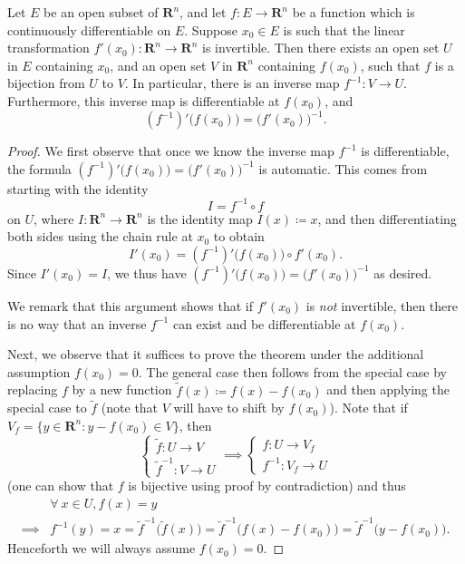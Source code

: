 \begin{theorem}\label{6.7.2}
    Let \(E\) be an open subset of \(\mathbf{R}^n\), and let \(f : E \to \mathbf{R}^n\) be a function which is continuously differentiable on \(E\).
    Suppose \(x_0 \in E\) is such that the linear transformation \(f'(x_0) : \mathbf{R}^n \to \mathbf{R}^n\) is invertible.
    Then there exists an open set \(U\) in \(E\) containing \(x_0\), and an open set \(V\) in \(\mathbf{R}^n\) containing \(f(x_0)\), such that \(f\) is a bijection from \(U\) to \(V\).
    In particular, there is an inverse map \(f^{-1} : V \to U\).
    Furthermore, this inverse map is differentiable at \(f(x_0)\), and
    \[
        (f^{-1})' \big(f(x_0)\big) = \big(f'(x_0)\big)^{-1}.
    \]
\end{theorem}

\begin{proof}
    We first observe that once we know the inverse map \(f^{-1}\) is differentiable, the formula \((f^{-1})' \big(f(x_0)\big) = \big(f'(x_0)\big)^{-1}\) is automatic.
    This comes from starting with the identity
    \[
        I = f^{-1} \circ f
    \]
    on \(U\), where \(I : \mathbf{R}^n \to \mathbf{R}^n\) is the identity map \(I(x) \coloneqq x\), and then differentiating both sides using the chain rule at \(x_0\) to obtain
    \[
        I'(x_0) = (f^{-1})' \big(f(x_0)\big) \circ f'(x_0).
    \]
    Since \(I'(x_0) = I\), we thus have \((f^{-1})' \big(f(x_0)\big) = \big(f'(x_0)\big)^{-1}\) as desired.

    We remark that this argument shows that if \(f'(x_0)\) is \emph{not} invertible, then there is no way that an inverse \(f^{-1}\) can exist and be differentiable at \(f(x_0)\).

    Next, we observe that it suffices to prove the theorem under the additional assumption \(f(x_0) = 0\).
    The general case then follows from the special case by replacing \(f\) by a new function \(\tilde{f}(x) \coloneqq f(x) - f(x_0)\) and then applying the special case to \(\tilde{f}\)
    (note that \(V\) will have to shift by \(f(x_0)\)).
    Note that if \(V_f = \{y \in \mathbf{R}^n : y - f(x_0) \in V\}\), then
    \[
        \begin{cases}
            \tilde{f} : U \to V \\
            \tilde{f}^{-1} : V \to U
        \end{cases} \implies \begin{cases}
            f : U \to V_f \\
            f^{-1} : V_f \to U
        \end{cases}
    \]
    (one can show that \(f\) is bijective using proof by contradiction)
    and thus
    \begin{align*}
                 & \forall\ x \in U, f(x) = y                                                                                                         \\
        \implies & f^{-1}(y) = x = \tilde{f}^{-1}\big(\tilde{f}(x)\big) = \tilde{f}^{-1}\big(f(x) - f(x_0)\big) = \tilde{f}^{-1}\big(y - f(x_0)\big).
    \end{align*}
    Henceforth we will always assume \(f(x_0) = 0\).


\end{proof}
